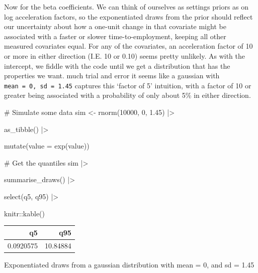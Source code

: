 \documentclass[
  letterpaper,
  DIV=11,
  numbers=noendperiod]{scrreprt}
\newenvironment{Shaded}{\begin{snugshade}}{\end{snugshade}}
\newcommand{\AttributeTok}[1]{\textcolor[rgb]{0.40,0.45,0.13}{#1}}
\newcommand{\CommentTok}[1]{\textcolor[rgb]{0.37,0.37,0.37}{#1}}
\newcommand{\DecValTok}[1]{\textcolor[rgb]{0.68,0.00,0.00}{#1}}
\newcommand{\FloatTok}[1]{\textcolor[rgb]{0.68,0.00,0.00}{#1}}
\newcommand{\FunctionTok}[1]{\textcolor[rgb]{0.28,0.35,0.67}{#1}}
\newcommand{\NormalTok}[1]{\textcolor[rgb]{0.00,0.23,0.31}{#1}}
\newcommand{\OtherTok}[1]{\textcolor[rgb]{0.00,0.23,0.31}{#1}}
\newcommand{\SpecialCharTok}[1]{\textcolor[rgb]{0.37,0.37,0.37}{#1}}
\begin{document}
Now for the beta coefficients. We can think of ourselves as settings
priors as on log acceleration factors, so the exponentiated draws from
the prior should reflect our uncertainty about how a one-unit change in
that covariate might be associated with a faster or slower
time-to-employment, keeping all other measured covariates equal. For any
of the covariates, an acceleration factor of 10 or more in either
direction (I.E. 10 or 0.10) seems pretty unlikely. As with the
intercept, we fiddle with the code until we get a distribution that has
the properties we want. much trial and error it seems like a gaussian
with \texttt{mean\ =\ 0,\ sd\ =\ 1.45} captures this `factor of 5'
intuition, with a factor of 10 or greater being associated with a
probability of only about 5\% in either direction.

\begin{Shaded}
\begin{Highlighting}[]
\CommentTok{\# Simulate some data}
\NormalTok{sim }\OtherTok{\textless{}{-}} \FunctionTok{rnorm}\NormalTok{(}\DecValTok{10000}\NormalTok{, }\DecValTok{0}\NormalTok{, }\FloatTok{1.45}\NormalTok{) }\SpecialCharTok{|\textgreater{}}

  \FunctionTok{as\_tibble}\NormalTok{() }\SpecialCharTok{|\textgreater{}}

  \FunctionTok{mutate}\NormalTok{(}\AttributeTok{value =} \FunctionTok{exp}\NormalTok{(value)) }

\CommentTok{\# Get the quantiles}
\NormalTok{sim }\SpecialCharTok{|\textgreater{}} 

  \FunctionTok{summarise\_draws}\NormalTok{() }\SpecialCharTok{|\textgreater{}}

  \FunctionTok{select}\NormalTok{(q5, q95) }\SpecialCharTok{|\textgreater{}}

\NormalTok{  knitr}\SpecialCharTok{::}\FunctionTok{kable}\NormalTok{()}
\end{Highlighting}
\end{Shaded}

\begin{longtable}[]{@{}rr@{}}
\toprule()
q5 & q95 \\
\midrule()
\endhead
0.0920575 & 10.84884 \\
\bottomrule()
\end{longtable}

Exponentiated draws from a gaussian distribution with mean = 0, and sd =
1.45
\end{document}
